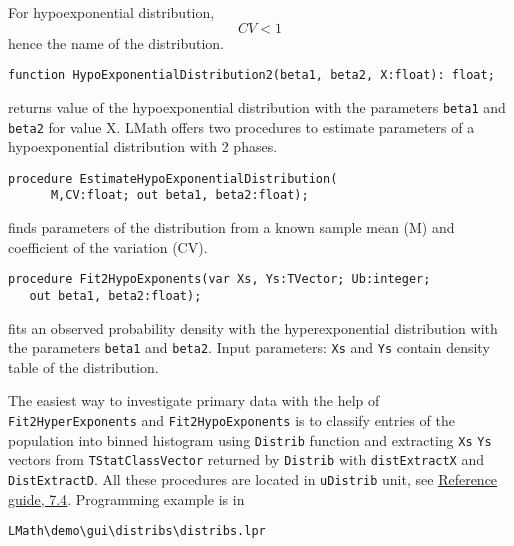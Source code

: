 \documentclass[12pt,a4paper,oneside]{article}
\newcommand{\code}[1]{\texttt{#1}}
\begin{document}
For hypoexponential distribution,
$$
CV < 1
$$
hence the name of the distribution.
\begin{verbatim}
function HypoExponentialDistribution2(beta1, beta2, X:float): float;
\end{verbatim}\vspace{-6pt}
returns value of the hypoexponential distribution with the parameters \code{beta1} and \code{beta2} for value X.
LMath offers two procedures to estimate parameters of a hypoexponential distribution with 2 phases. 
\begin{verbatim}
procedure EstimateHypoExponentialDistribution(
      M,CV:float; out beta1, beta2:float);
\end{verbatim}\vspace{-6pt}
finds parameters of the distribution from a known sample mean (M) and coefficient of the variation (CV).
\begin{verbatim}
procedure Fit2HypoExponents(var Xs, Ys:TVector; Ub:integer; 
   out beta1, beta2:float);
\end{verbatim}\vspace{-6pt}
fits an observed probability density with the hyperexponential distribution with the parameters \code{beta1} and \code{beta2}. Input parameters: \code{Xs} and \code{Ys} contain density table of the distribution.

The easiest way to investigate primary data with the help of \code{Fit2HyperExponents} and \code{Fit2HypoExponents} is to classify entries of the population into binned histogram using \code{Distrib} function and extracting \code{Xs} \code{Ys} vectors from \code{TStatClassVector} returned by \code{Distrib} with \code{distExtractX} and \code{DistExtractD}. All these procedures are located in \code{uDistrib} unit, see \href{LMath0_5.pdf#lmMathStat.uDistrib}{Reference guide, 7.4}.
Programming example is in
\begin{verbatim}
LMath\demo\gui\distribs\distribs.lpr 
\end{verbatim}
\end{document}
